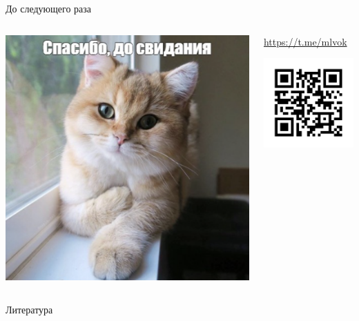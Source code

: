 \documentclass[11pt,aspectratio=169,handout]{beamer}
\begin{document}
\begin{frame}{До следующего раза \cite{zhai2024actions}}

\begin{columns}
\begin{column}{0.45\textwidth}
   \begin{center}
                \includegraphics[scale=0.35]{images/bye.png}
   \end{center}
\end{column}
\begin{column}{0.45\textwidth}
   \begin{center}
                \url{https://t.me/mlvok}

                \includegraphics[scale=0.5]{images/tgqr.png}
   \end{center}
\end{column}
\end{columns}

\end{frame}

\begin{frame}[allowframebreaks]{Литература}




\end{frame}
\end{document}
